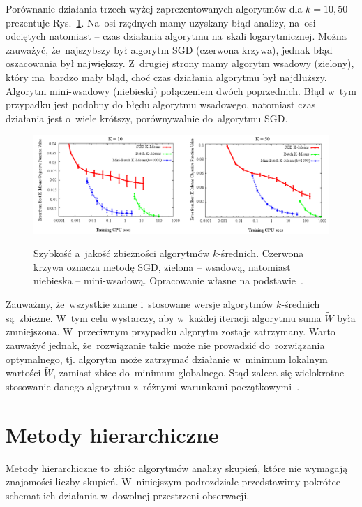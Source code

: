 \documentclass{praca1}
\begin{document}
Porównanie działania trzech wyżej zaprezentowanych algorytmów dla $k=10, 50$ prezentuje Rys.~\ref{plot:000}. Na~osi rzędnych mamy uzyskany błąd analizy, na~osi odciętych natomiast -- czas działania algorytmu na~skali logarytmicznej. Można zauważyć, że~najszybszy był algorytm SGD (czerwona krzywa), jednak błąd oszacowania był największy. Z~drugiej strony mamy algorytm wsadowy (zielony), który ma~bardzo mały błąd, choć czas działania algorytmu był najdłuższy. Algorytm mini-wsadowy (niebieski) połączeniem dwóch poprzednich. Błąd w~tym przypadku jest podobny do błędu algorytmu wsadowego, natomiast czas działania jest o~wiele krótszy, porównywalnie do~algorytmu SGD. 

\begin{figure}[!h]
  \centering
  \includegraphics[width=450pt]{plot00.png}\\
  \caption{Szybkość a~jakość zbieżności algorytmów $k$-średnich. Czerwona krzywa oznacza metodę SGD, zielona -- wsadową, natomiast niebieska -- mini-wsadową.  Opracowanie własne na podstawie~\cite{Sculley2010:webkmeans}.}\label{plot:000}
\end{figure}


Zauważmy, że~wszystkie znane i~stosowane wersje algorytmów $k$-średnich są~zbieżne. W~tym celu wystarczy, aby w~każdej iteracji algorytmu suma $\widetilde{W}$ była zmniejszona. W~przeciwnym przypadku algorytm zostaje zatrzymany. Warto zauważyć jednak, że~rozwiązanie takie może nie prowadzić do~rozwiązania optymalnego, tj. algorytm może zatrzymać działanie w~minimum lokalnym wartości $\widetilde{W}$, zamiast zbiec do~minimum globalnego. Stąd zaleca się wielokrotne stosowanie danego algorytmu z~różnymi warunkami początkowymi~\cite{Koronacki2005:statystyczne}.


\section{Metody hierarchiczne}

Metody hierarchiczne to~zbiór algorytmów analizy skupień, które nie wymagają znajomości liczby skupień. W~niniejszym podrozdziale przedstawimy pokrótce schemat ich działania w~dowolnej przestrzeni obserwacji.
\end{document}

